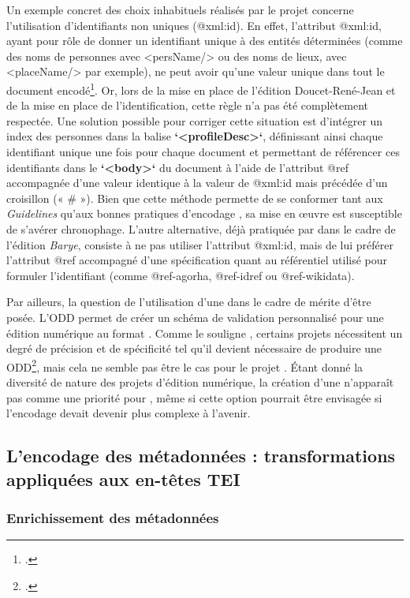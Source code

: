 Un exemple concret des choix inhabituels réalisés par le projet \pense concerne l’utilisation d’identifiants non uniques (@xml:id). En effet, l’attribut @xml:id, ayant pour rôle de donner un identifiant unique à des entités déterminées (comme des noms de personnes avec <persName/> ou des noms de lieux, avec <placeName/> par exemple), ne peut avoir qu’une valeur unique dans tout le document encodé\footcite{marsh_xmlid_2005}. Or, lors de la mise en place de l’édition Doucet-René-Jean et de la mise en place de l’identification, cette règle n’a pas été complètement respectée.  Une solution possible pour corriger cette situation est d’intégrer un index des personnes dans la balise \textbf{`<profileDesc>`}, définissant ainsi chaque identifiant unique une fois pour chaque document et permettant de référencer ces identifiants dans le \textbf{`<body>`} du document à l’aide de l’attribut @ref accompagnée d’une valeur identique à la valeur de @xml:id mais précédée d’un croisillon (« # »). 
Bien que cette méthode permette de se conformer tant aux \textit{Guidelines} \tei qu’aux bonnes pratiques d’encodage \xml, sa mise en œuvre est susceptible de s’avérer chronophage. 
L’autre alternative, déjà pratiquée par \pense dans le cadre de l’édition \textit{Barye}, consiste à ne pas utiliser l’attribut @xml:id, mais de lui préférer l’attribut @ref accompagné d’une spécification quant au référentiel utilisé pour formuler l’identifiant (comme @ref-agorha, @ref-idref ou @ref-wikidata). 

Par ailleurs, la question de l’utilisation d’une \odd dans le cadre de \pense mérite d’être posée. L’ODD permet de créer un schéma de validation personnalisé pour une édition numérique au format \tei. Comme le souligne \citeauthor{biay_chaine_2022}, certains projets nécessitent un degré de précision et de spécificité tel qu’il devient nécessaire de produire une ODD\footcite[p.72]{biay_chaine_2022}, mais cela ne semble pas être le cas pour le projet \pense. Étant donné la diversité de nature des projets d’édition numérique, la création d’une \odd n’apparaît pas comme une priorité pour \pense, même si cette option pourrait être envisagée si l’encodage devait devenir plus complexe à l’avenir.

\subsection{L’encodage des métadonnées : transformations appliquées aux en-têtes TEI}

\subsubsection{Enrichissement des métadonnées}

